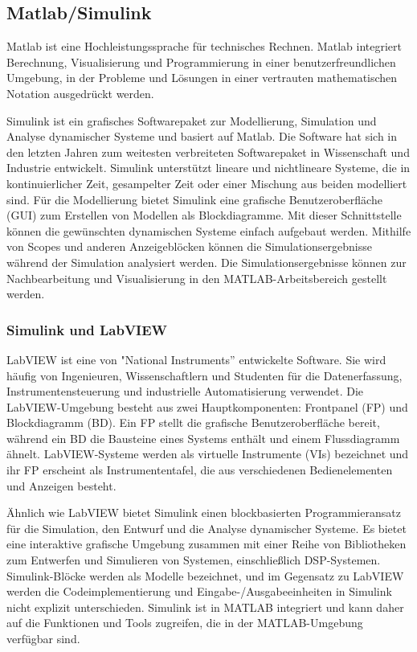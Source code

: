 %
%
%
%
\subsection{Matlab/Simulink}

Matlab ist eine Hochleistungssprache für technisches Rechnen. Matlab integriert Berechnung, Visualisierung und Programmierung in einer benutzerfreundlichen Umgebung, in der Probleme und Lösungen in einer vertrauten mathematischen Notation ausgedrückt werden.

Simulink ist ein grafisches Softwarepaket zur Modellierung, Simulation und Analyse dynamischer Systeme und basiert auf Matlab. 
Die Software hat sich in den letzten Jahren zum weitesten verbreiteten Softwarepaket in Wissenschaft und Industrie entwickelt.
Simulink unterstützt lineare und nichtlineare Systeme, die in kontinuierlicher Zeit, gesampelter Zeit oder einer Mischung aus beiden modelliert sind. Für die Modellierung bietet Simulink eine grafische Benutzeroberfläche (GUI) zum Erstellen von Modellen als Blockdiagramme. Mit dieser Schnittstelle können die gewünschten dynamischen Systeme einfach aufgebaut werden. Mithilfe von Scopes und anderen Anzeigeblöcken können die Simulationsergebnisse während der Simulation analysiert werden. Die Simulationsergebnisse können zur Nachbearbeitung und Visualisierung in den MATLAB-Arbeitsbereich gestellt werden. \cite{Iov2004}\cite{Karris2008}\\



\subsubsection{Simulink und LabVIEW} 
LabVIEW ist eine von "National Instruments'' entwickelte Software. Sie wird häufig von Ingenieuren, Wissenschaftlern und Studenten für die Datenerfassung, Instrumentensteuerung und industrielle Automatisierung verwendet. Die LabVIEW-Umgebung besteht aus zwei Hauptkomponenten: Frontpanel (FP) und Blockdiagramm (BD). Ein FP stellt die grafische Benutzeroberfläche bereit, während ein BD die Bausteine eines Systems enthält und einem Flussdiagramm ähnelt. LabVIEW-Systeme werden als virtuelle Instrumente (VIs) bezeichnet und ihr FP erscheint als Instrumententafel, die aus verschiedenen Bedienelementen und Anzeigen besteht.

Ähnlich wie LabVIEW bietet Simulink einen blockbasierten Programmieransatz für die Simulation, den Entwurf und die Analyse dynamischer Systeme. Es bietet eine interaktive grafische Umgebung zusammen mit einer Reihe von Bibliotheken zum Entwerfen und Simulieren von Systemen, einschließlich DSP-Systemen. Simulink-Blöcke werden als Modelle bezeichnet, und im Gegensatz zu LabVIEW werden die Codeimplementierung und Eingabe-/Ausgabeeinheiten in Simulink nicht explizit unterschieden. Simulink ist in MATLAB integriert und kann daher auf die Funktionen und Tools zugreifen, die in der MATLAB-Umgebung verfügbar sind. \cite{Kehtarnavaz2006} \cite{Cansalar2015}\\

